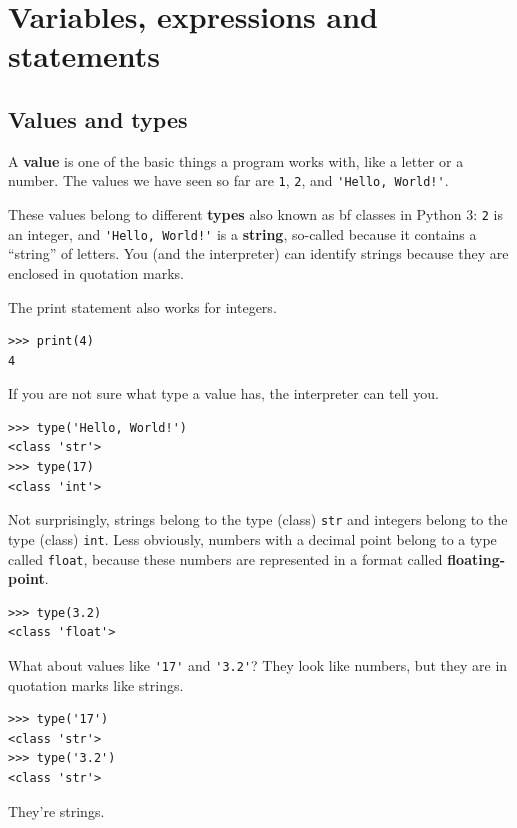 \chapter{Variables, expressions and statements}

\section{Values and types}

A {\bf value} is one of the basic things a program works with,
like a letter or a
number.  The values we have seen so far
are {\tt 1}, {\tt 2}, and
\verb"'Hello, World!'".

These values belong to different {\bf types} also known as {bf classes} in Python 3:
{\tt 2} is an integer, and \verb"'Hello, World!'" is a {\bf string},
so-called because it contains a ``string'' of letters.
You (and the interpreter) can identify
strings because they are enclosed in quotation marks.


The print statement also works for integers.

\beforeverb
\begin{verbatim}
>>> print(4)
4
\end{verbatim}
\afterverb
%
If you are not sure what type a value has, the interpreter can tell you.

\beforeverb
\begin{verbatim}
>>> type('Hello, World!')
<class 'str'>
>>> type(17)
<class 'int'>
\end{verbatim}
\afterverb
%
Not surprisingly, strings belong to the type (class) {\tt str} and
integers belong to the type (class) {\tt int}.  Less obviously, numbers
with a decimal point belong to a type called {\tt float},
because these numbers are represented in a
format called {\bf floating-point}.


\beforeverb
\begin{verbatim}
>>> type(3.2)
<class 'float'>
\end{verbatim}
\afterverb
%
What about values like \verb"'17'" and \verb"'3.2'"?
They look like numbers, but they are in quotation marks like
strings.
%
%
\beforeverb
\begin{verbatim}
>>> type('17')
<class 'str'>
>>> type('3.2')
<class 'str'>
\end{verbatim}
\afterverb
%
They're strings.

